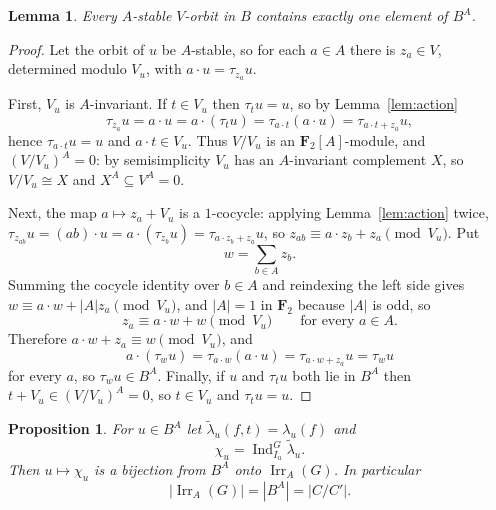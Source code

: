 \documentclass[11pt]{article}
\newtheorem{proposition}[theorem]{Proposition}
\newtheorem{lemma}[theorem]{Lemma}
\theoremstyle{definition}
\theoremstyle{remark}
\newcommand{\F}{\mathbf F}
\newcommand{\Irr}{\operatorname{Irr}}
\newcommand{\Ind}{\operatorname{Ind}}
\begin{document}
\begin{lemma}\label{lem:fixed-representative}
Every $A$-stable $V$-orbit in $B$ contains exactly one element of
$B^A$.
\end{lemma}

\begin{proof}
Let the orbit of $u$ be $A$-stable, so for each $a\in A$ there is
$z_a\in V$, determined modulo $V_u$, with $a\cdot u=\tau_{z_a}u$.

First, $V_u$ is $A$-invariant.  If $t\in V_u$ then $\tau_tu=u$, so by
Lemma~\ref{lem:action}
\[
 \tau_{z_a}u=a\cdot u=a\cdot(\tau_tu)=\tau_{a\cdot t}(a\cdot u)
 =\tau_{a\cdot t+z_a}u ,
\]
hence $\tau_{a\cdot t}u=u$ and $a\cdot t\in V_u$.  Thus $V/V_u$ is an
$\F_2[A]$-module, and $(V/V_u)^A=0$: by semisimplicity $V_u$ has an
$A$-invariant complement $X$, so $V/V_u\cong X$ and
$X^A\subseteq V^A=0$.

Next, the map $a\mapsto z_a+V_u$ is a $1$-cocycle: applying
Lemma~\ref{lem:action} twice,
$\tau_{z_{ab}}u=(ab)\cdot u=a\cdot(\tau_{z_b}u)=\tau_{a\cdot z_b+z_a}u$,
so $z_{ab}\equiv a\cdot z_b+z_a \pmod{V_u}$.  Put
\[
 w=\sum_{b\in A}z_b .
\]
Summing the cocycle identity over $b\in A$ and reindexing the left side
gives $w\equiv a\cdot w+|A|z_a\pmod{V_u}$, and $|A|=1$ in $\F_2$ because
$|A|$ is odd, so
\[
 z_a\equiv a\cdot w+w\pmod{V_u}\qquad\text{for every }a\in A .
\]
Therefore $a\cdot w+z_a\equiv w\pmod{V_u}$, and
\[
 a\cdot(\tau_wu)=\tau_{a\cdot w}(a\cdot u)=\tau_{a\cdot w+z_a}u=\tau_wu
\]
for every $a$, so $\tau_wu\in B^A$.  Finally, if $u$ and $\tau_tu$ both
lie in $B^A$ then $t+V_u\in(V/V_u)^A=0$, so $t\in V_u$ and
$\tau_tu=u$.
\end{proof}

\begin{proposition}\label{prop:invariant-irr}
For $u\in B^A$ let $\widetilde\lambda_u(f,t)=\lambda_u(f)$ and
\[
 \chi_u=\Ind_{I_u}^G\widetilde\lambda_u .
\]
Then $u\mapsto\chi_u$ is a bijection from $B^A$ onto $\Irr_A(G)$.  In
particular
\[
 |\Irr_A(G)|=|B^A|=|C/C'| .
\]
\end{proposition}
\end{document}
